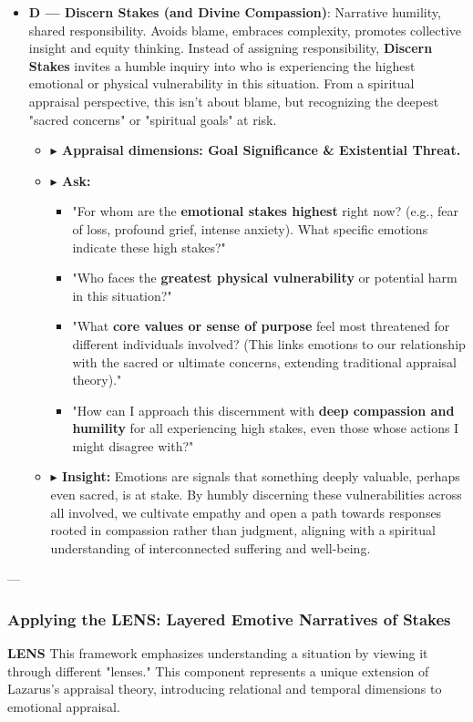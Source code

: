 \documentclass{article}
\begin{document}
\begin{itemize}[noitemsep,topsep=0pt]
    \item \textbf{D — Discern Stakes (and Divine Compassion)}: Narrative humility, shared responsibility. Avoids blame, embraces complexity, promotes collective insight and equity thinking. Instead of assigning responsibility, \textbf{Discern Stakes} invites a humble inquiry into who is experiencing the highest emotional or physical vulnerability in this situation. From a spiritual appraisal perspective, this isn't about blame, but recognizing the deepest "sacred concerns" or "spiritual goals" at risk.
    \begin{itemize}[noitemsep,topsep=0pt]
        \item \textbf{$\blacktriangleright$ Appraisal dimensions: Goal Significance \& Existential Threat.}
        \item \textbf{$\blacktriangleright$ Ask:}
        \begin{itemize}[noitemsep,topsep=0pt]
            \item "For whom are the \textbf{emotional stakes highest} right now? (e.g., fear of loss, profound grief, intense anxiety). What specific emotions indicate these high stakes?"
            \item "Who faces the \textbf{greatest physical vulnerability} or potential harm in this situation?"
            \item "What \textbf{core values or sense of purpose} feel most threatened for different individuals involved? (This links emotions to our relationship with the sacred or ultimate concerns, extending traditional appraisal theory)."
            \item "How can I approach this discernment with \textbf{deep compassion and humility} for all experiencing high stakes, even those whose actions I might disagree with?"
        \end{itemize}
        \item \textbf{$\blacktriangleright$ Insight:} Emotions are signals that something deeply valuable, perhaps even sacred, is at stake. By humbly discerning these vulnerabilities across all involved, we cultivate empathy and open a path towards responses rooted in compassion rather than judgment, aligning with a spiritual understanding of interconnected suffering and well-being.
    \end{itemize}
\end{itemize}

---

\subsubsection*{\textbf{Applying the LENS: Layered Emotive Narratives of Stakes}}
\textbf{LENS} This framework emphasizes understanding a situation by viewing it through different "lenses." This component represents a unique extension of Lazarus's appraisal theory, introducing relational and temporal dimensions to emotional appraisal.
\end{document}
